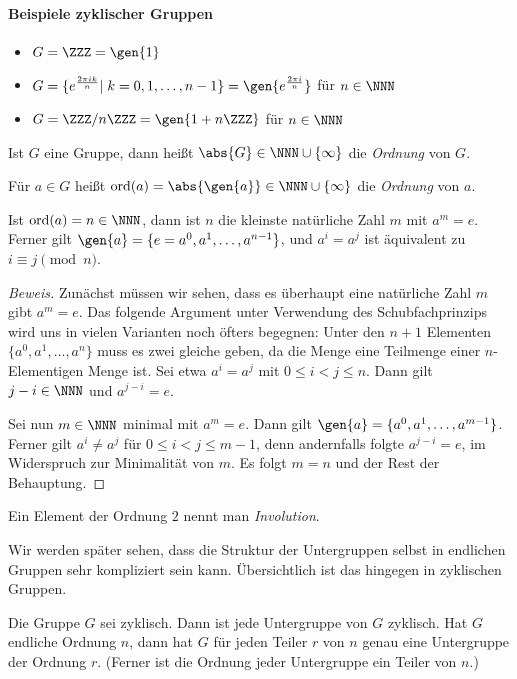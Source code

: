 \documentclass[12pt,a4paper,twoside]{article}
\newcommand{\ei}[1]{\emph{#1}\index{#1}}
\DeclareMathOperator{\ord}{ord}
\begin{document}
\paragraph{Beispiele zyklischer Gruppen}
\begin{itemize}
\item $G=\ZZZ=\gen{1}$
\item $G=\{e^{\frac{2\pi ik}{n}}|\;k=0,1,\dots,n-1\}=\gen{e^{\frac{2\pi
        i}{n}}}$ f\"ur $n\in\NNN$
\item $G=\ZZZ/n\ZZZ=\gen{1+n\ZZZ}$ f\"ur $n\in\NNN$
\end{itemize}
\begin{Definition}
Ist $G$ eine Gruppe, dann hei\ss t $\abs{G}\in\NNN\cup\{\infty\}$ die
\ei{Ordnung} von $G$.

F\"ur $a\in G$ hei\ss t $\ord(a)=\abs{\gen{a}}\in\NNN\cup\{\infty\}$ die
\ei{Ordnung} von $a$.
\end{Definition}
\begin{Lemma}
  Ist $\ord(a)=n\in\NNN$, dann ist $n$ die kleinste nat\"urliche Zahl $m$ mit
  $a^m=e$. Ferner gilt $\gen{a}=\{e=a^0,a^1,\dots,a^{n-1}\}$, und $a^i=a^j$
  ist \"aquivalent zu $i\equiv j\pmod{n}$.
\end{Lemma}
\begin{proof}[Beweis]
Zun\"achst m\"ussen wir sehen, dass es \"uberhaupt eine nat\"urliche Zahl $m$
  gibt $a^m=e$. Das folgende Argument unter Verwendung des Schubfachprinzips
  wird uns in vielen Varianten noch \"ofters begegnen: Unter den $n+1$
  Elementen $\{a^0,a^1,\dots,a^n\}$ muss es zwei gleiche geben, da die Menge
  eine Teilmenge einer $n$-Elementigen Menge ist. Sei etwa $a^i=a^j$ mit $0\le
  i<j\le n$. Dann gilt $j-i\in\NNN$ und $a^{j-i}=e$.
  
  Sei nun $m\in\NNN$ minimal mit $a^m=e$. Dann gilt
  $\gen{a}=\{a^0,a^1,\dots,a^{m-1}\}$. Ferner gilt $a^i\ne a^j$ f\"ur $0\le
  i<j\le m-1$, denn andernfalls folgte $a^{j-i}=e$, im Widerspruch zur
  Minimalit\"at von $m$. Es folgt $m=n$ und der Rest der Behauptung.
\end{proof}
\begin{Definition}
  Ein Element der Ordnung $2$ nennt man \ei{Involution}.
\end{Definition}
Wir werden sp\"ater sehen, dass die Struktur der Untergruppen selbst in
endlichen Gruppen sehr kompliziert sein kann. \"Ubersichtlich ist das hingegen
in zyklischen Gruppen.
\begin{Satz}
  Die Gruppe $G$ sei zyklisch. Dann ist jede Untergruppe von $G$ zyklisch.
  Hat $G$ endliche Ordnung $n$, dann hat $G$ f\"ur jeden Teiler $r$ von $n$
  genau eine Untergruppe der Ordnung $r$. (Ferner ist die Ordnung jeder
  Untergruppe ein Teiler von $n$.)
\end{Satz}
\end{document}
